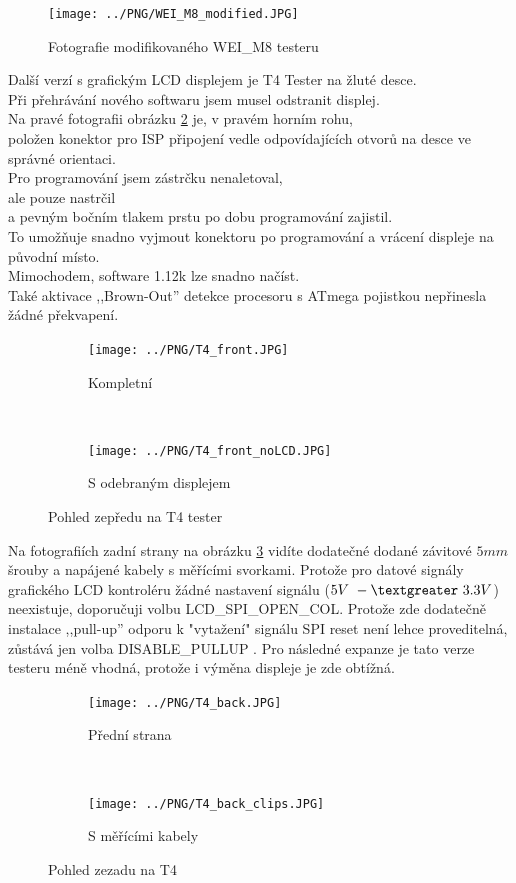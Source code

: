 \begin{figure}[H]
\centering
\texttt{[image: ../PNG/WEI\_M8\_modified.JPG]}
\caption{Fotografie modifikovaného WEI\_M8 testeru}
\label{fig:WeiM8mod}
\end{figure}

Další verzí s grafickým LCD displejem je T4 Tester na žluté desce.\\
Při přehrávání nového softwaru jsem musel odstranit displej.\\
Na pravé fotografii obrázku \ref{fig:T4_front} je, v pravém horním rohu,\\
 položen konektor pro ISP připojení
vedle odpovídajících otvorů na desce ve správné orientaci.\\
Pro programování jsem zástrčku nenaletoval,\\ ale pouze nastrčil\\ a pevným bočním tlakem prstu po dobu
programování zajistil.\\To umožňuje snadno vyjmout konektoru po programování a vrácení displeje na původní místo.\\
Mimochodem, software 1.12k lze snadno načíst.\\
Také aktivace  ,,Brown-Out'' detekce procesoru s ATmega pojistkou nepřinesla žádné překvapení.

\begin{figure}[H]
  \begin{subfigure}[b]{9cm}
    \centering
    \texttt{[image: ../PNG/T4\_front.JPG]}
    \caption{Kompletní}
  \end{subfigure}
  ~
  \begin{subfigure}[b]{9cm}
    \centering
    \texttt{[image: ../PNG/T4\_front\_noLCD.JPG]}
    \caption{S odebraným displejem}
  \end{subfigure}
  \caption{Pohled zepředu na T4 tester}
  \label{fig:T4_front}
\end{figure}

Na fotografiích zadní strany na obrázku \ref{fig:T4_back} vidíte dodatečné dodané
závitové \(5mm\) šrouby a napájené kabely s měřícími svorkami.
Protože pro datové signály grafického LCD kontroléru žádné nastavení signálu (\(5V~-\textgreater ~3.3V\)) neexistuje, doporučuji volbu LCD\_SPI\_OPEN\_COL.
Protože zde dodatečně instalace ,,pull-up'' odporu k "vytažení" signálu SPI reset
není lehce proveditelná, zůstává jen volba DISABLE\_PULLUP . 
Pro následné expanze je tato verze testeru méně vhodná, protože i výměna displeje je zde obtížná.

\begin{figure}[H]
  \begin{subfigure}[b]{9cm}
    \centering
    \texttt{[image: ../PNG/T4\_back.JPG]}
    \caption{Přední strana}
  \end{subfigure}
  ~
  \begin{subfigure}[b]{9cm}
    \centering
    \texttt{[image: ../PNG/T4\_back\_clips.JPG]}
    \caption{S měřícími kabely}
  \end{subfigure}
  \caption{Pohled zezadu na T4}
  \label{fig:T4_back}
\end{figure}

